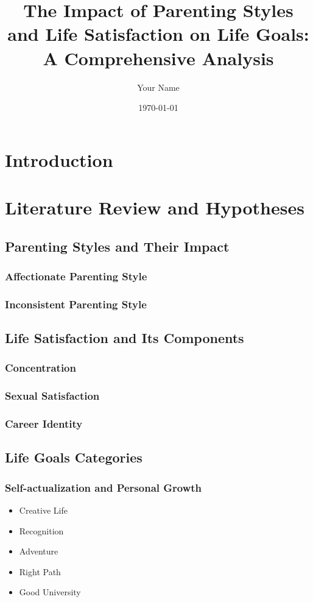 \documentclass[12pt,a4paper]{article}
\title{The Impact of Parenting Styles and Life Satisfaction on Life Goals: A Comprehensive Analysis}
\author{Your Name}
\date{\today}
\begin{document}
\maketitle

\begin{abstract}
\end{abstract}

\section{Introduction}

\section{Literature Review and Hypotheses}
\subsection{Parenting Styles and Their Impact}
\subsubsection{Affectionate Parenting Style}
\subsubsection{Inconsistent Parenting Style}

\subsection{Life Satisfaction and Its Components}
\subsubsection{Concentration}
\subsubsection{Sexual Satisfaction}
\subsubsection{Career Identity}

\subsection{Life Goals Categories}
\subsubsection{Self-actualization and Personal Growth}
\begin{itemize}
    \item Creative Life
    \item Recognition
    \item Adventure
    \item Right Path
    \item Good University
\end{itemize}
\end{document}
